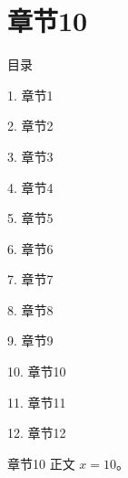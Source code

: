 \documentclass[aspectratio=169,10pt,fontset=fandol]{ctexbeamer}
\begin{document}
\section{章节10}
\begin{frame}[t,fragile]{目录}
\small
{\color{black}\small 1. 章节1\par}\vspace{0.22em}
{\color{black}\small 2. 章节2\par}\vspace{0.22em}
{\color{black}\small 3. 章节3\par}\vspace{0.22em}
{\color{black}\small 4. 章节4\par}\vspace{0.22em}
{\color{black}\small 5. 章节5\par}\vspace{0.22em}
{\color{black}\small 6. 章节6\par}\vspace{0.22em}
{\color{black}\small 7. 章节7\par}\vspace{0.22em}
{\color{black}\small 8. 章节8\par}\vspace{0.22em}
{\color{black}\small 9. 章节9\par}\vspace{0.22em}
{\color{blue}\small 10. 章节10\par}\vspace{0.22em}
{\color{gray!40}\small 11. 章节11\par}\vspace{0.22em}
{\color{gray!40}\small 12. 章节12\par}\vspace{0.22em}
\end{frame}
\begin{frame}[t,fragile]{章节10}
\normalsize
{\normalsize
正文 $x=10$。
}
\end{frame}
\end{document}
